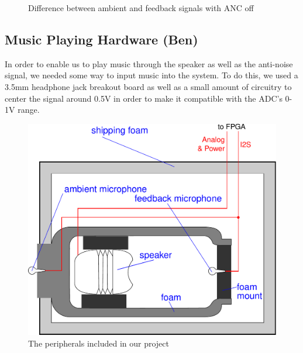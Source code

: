 \documentclass{fpgairpods}
\begin{document}

\begin{figure}
    \centering
    \caption{Difference between ambient and feedback signals with ANC off}
    \label{chart:passive_response}
\end{figure}

\subsection{Music Playing Hardware (Ben)}
In order to enable us to play music  through the speaker as well as the anti-noise signal, we needed some way to input music into the system. To do this, we used a 3.5mm headphone jack breakout board as well as a small amount of circuitry to center the signal around 0.5V in order to make it compatible with the ADC's 0-1V range.

\begin{figure}
\centering
\includegraphics[width=450pt]{./figs/system_diagram_with_text.pdf}
\caption{The peripherals included in our project}
\label{fig:peripherals}
\end{figure}
\end{document}
